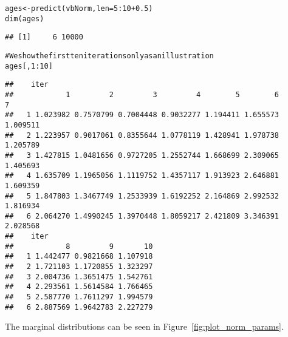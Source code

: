 \documentclass[a4paper,english,10pt]{article}\usepackage[]{graphicx}\usepackage[]{color}
\makeatletter
\newcommand{\hlnum}[1]{\textcolor[rgb]{0.2,0.2,0.2}{#1}}%
\newcommand{\hlcom}[1]{\textcolor[rgb]{0.2,0.267,0.4}{#1}}%
\newcommand{\hlopt}[1]{\textcolor[rgb]{0.2,0.2,0.2}{#1}}%
\newcommand{\hlstd}[1]{\textcolor[rgb]{0,0,0}{#1}}%
\newcommand{\hlkwb}[1]{\textcolor[rgb]{0.361,0.506,0.596}{#1}}%
\newcommand{\hlkwc}[1]{\textcolor[rgb]{0.361,0.506,0.596}{#1}}%
\newcommand{\hlkwd}[1]{\textcolor[rgb]{0.361,0.506,0.596}{#1}}%
\newenvironment{kframe}{%
 \def\at@end@of@kframe{}%
 \ifinner\ifhmode%
  \def\at@end@of@kframe{\end{minipage}}%
  \begin{minipage}{\columnwidth}%
 \fi\fi%
 \def\FrameCommand##1{\hskip\@totalleftmargin \hskip-\fboxsep
 \colorbox{shadecolor}{##1}\hskip-\fboxsep
     \hskip-\linewidth \hskip-\@totalleftmargin \hskip\columnwidth}%
 \MakeFramed {\advance\hsize-\width
   \@totalleftmargin\z@ \linewidth\hsize
   \@setminipage}}%
 {\par\unskip\endMakeFramed%
 \at@end@of@kframe}
\newenvironment{knitrout}{}{} %
\makeatother
\begin{document}
\begin{knitrout}
\color{fgcolor}\begin{kframe}
\begin{alltt}
\hlstd{ages} \hlkwb{<-} \hlkwd{predict}\hlstd{(vbNorm,} \hlkwc{len}\hlstd{=}\hlnum{5}\hlopt{:}\hlnum{10}\hlopt{+}\hlnum{0.5}\hlstd{)}
\hlkwd{dim}\hlstd{(ages)}
\end{alltt}
\begin{verbatim}
## [1]     6 10000
\end{verbatim}
\begin{alltt}
\hlcom{# We show the first ten iterations only as an illustration}
\hlstd{ages[,}\hlnum{1}\hlopt{:}\hlnum{10}\hlstd{]}
\end{alltt}
\begin{verbatim}
##    iter
##            1         2         3         4        5        6        7
##   1 1.023982 0.7570799 0.7004448 0.9032277 1.194411 1.655573 1.009511
##   2 1.223957 0.9017061 0.8355644 1.0778119 1.428941 1.978738 1.205789
##   3 1.427815 1.0481656 0.9727205 1.2552744 1.668699 2.309065 1.405693
##   4 1.635709 1.1965056 1.1119752 1.4357117 1.913923 2.646881 1.609359
##   5 1.847803 1.3467749 1.2533939 1.6192252 2.164869 2.992532 1.816934
##   6 2.064270 1.4990245 1.3970448 1.8059217 2.421809 3.346391 2.028568
##    iter
##            8         9       10
##   1 1.442477 0.9821668 1.107918
##   2 1.721103 1.1720855 1.323297
##   3 2.004736 1.3651475 1.542761
##   4 2.293561 1.5614584 1.766465
##   5 2.587770 1.7611297 1.994579
##   6 2.887569 1.9642783 2.227279
\end{verbatim}
\end{kframe}
\end{knitrout}

The marginal distributions can be seen in Figure~\ref{fig:plot_norm_params}.
\end{document}

